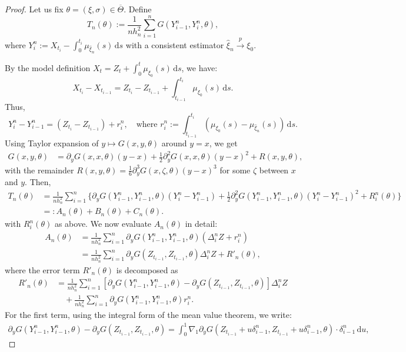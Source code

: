 \documentclass[a4paper,10pt,twoside]{article}
\numberwithin{equation}{section}
\def\l{\left}
\def\r{\right}
\def\p{\partial}
\def\toP{\stackrel{p}{\longrightarrow}}
\def\wh#1{\widehat{#1}}
\def\ol#1{\overline{#1}}
\def\df{\mathrm{d}}
\begin{document}
\begin{proof}
Let us fix \( \theta = (\xi, \sigma) \in \ol{\Theta} \). Define
\[
T_n(\theta) := \frac{1}{n h_n^2} \sum_{i=1}^n G\l(Y_{i-1}^n, Y_i^n, \theta\r),
\]
where \( Y_i^n := X_{t_i} - \int_0^{t_i} \mu_{\wh{\xi}_n}(s)\,\df s \) with a consistent estimator \( \wh{\xi}_n \toP \xi_0 \).

By the model definition \( X_t = Z_t + \int_0^t \mu_{\xi_0}(s)\,\df s \), we have:
\[
X_{t_i} - X_{t_{i-1}} = Z_{t_i} - Z_{t_{i-1}} + \int_{t_{i-1}}^{t_i} \mu_{\xi_0}(s)\,\df s.
\]
Thus,
\[
Y_i^n - Y_{i-1}^n = (Z_{t_i} - Z_{t_{i-1}}) + r_i^n, \quad\text{where } r_i^n := \int_{t_{i-1}}^{t_i} (\mu_{\xi_0}(s) - \mu_{\wh{\xi}_n}(s))\,\df s.
\]
Using Taylor expansion of \( y \mapsto G(x,y,\theta) \) around \( y = x \), we get
\begin{align*}
G(x,y,\theta) &= \p_y G(x,x,\theta)(y - x) + \frac{1}{2} \p_y^2 G(x,x,\theta)(y - x)^2 + R(x,y,\theta),
\end{align*}
with the remainder \( R(x,y,\theta) = \frac{1}{6} \p_y^3 G(x, \zeta, \theta)(y - x)^3 \) for some \( \zeta \) between \( x \) and \( y \). Then,
\begin{align*}
T_n(\theta) &= \frac{1}{n h_n^2} \sum_{i=1}^n \Bigg\{ \p_y G(Y_{i-1}^n, Y_{i-1}^n, \theta)(Y_i^n - Y_{i-1}^n) + \frac{1}{2} \p_y^2 G(Y_{i-1}^n, Y_{i-1}^n, \theta)(Y_i^n - Y_{i-1}^n)^2 + R_i^n(\theta) \Bigg\} \\
&=: A_n(\theta)  + B_n(\theta) + C_n(\theta). 
\end{align*}
with \( R_i^n(\theta) \) as above. We now evaluate \( A_n(\theta) \) in detail:
\begin{align*}
A_n(\theta) &= \frac{1}{n h_n^2} \sum_{i=1}^n \p_y G(Y_{i-1}^n, Y_{i-1}^n, \theta)(\Delta_i^n Z + r_i^n) \\
&= \frac{1}{n h_n^2} \sum_{i=1}^n \p_y G(Z_{t_{i-1}}, Z_{t_{i-1}}, \theta) \Delta_i^n Z + R'_n(\theta),
\end{align*}
where the error term \( R'_n(\theta) \) is decomposed as
\begin{align*}
R'_n(\theta) &= \frac{1}{n h_n^2} \sum_{i=1}^n \l[ \p_y G(Y_{i-1}^n, Y_{i-1}^n, \theta) - \p_y G(Z_{t_{i-1}}, Z_{t_{i-1}}, \theta) \r] \Delta_i^n Z \\
&\quad + \frac{1}{n h_n^2} \sum_{i=1}^n \p_y G(Y_{i-1}^n, Y_{i-1}^n, \theta) r_i^n.
\end{align*}
For the first term, using the integral form of the mean value theorem, we write:
\begin{align*}
\p_y G(Y_{i-1}^n, Y_{i-1}^n, \theta) - \p_y G(Z_{t_{i-1}}, Z_{t_{i-1}}, \theta) = \int_0^1 \nabla_1 \p_y G(Z_{t_{i-1}} + u \delta_{i-1}^n, Z_{t_{i-1}} + u \delta_{i-1}^n, \theta) \cdot \delta_{i-1}^n \,\df u,

\end{align*}
\end{proof}
\end{document}

